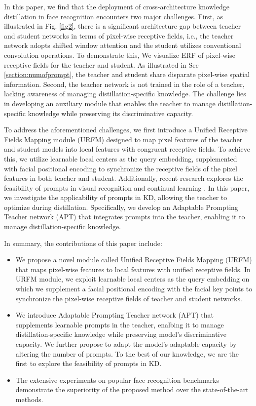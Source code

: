 \documentclass[sigconf]{acmart}
\begin{document}
In this paper, we find that the deployment of cross-architecture knowledge distillation in face recognition encounters two major challenges. First, as illustrated in Fig. \ref{fig2}, there is a significant architecture gap between teacher and student networks in terms of pixel-wise receptive fields, i.e., the teacher network adopts shifted window attention \cite{swin} and the student utilizes conventional convolution operations. To demonstrate this, We visualize ERF \cite{erf} of pixel-wise receptive fields for the teacher and student. As illustrated in Sec \ref{section:numofprompt}, the teacher and student share disparate pixel-wise spatial information. Second, the teacher network is not trained in the role of a teacher, lacking awareness of managing distillation-specific knowledge. The challenge lies in developing an auxiliary module that enables the teacher to manage distillation-specific knowledge while preserving its discriminative capacity.

To address the aforementioned challenges, we first introduce a Unified Receptive Fields Mapping module (URFM) designed to map pixel features of the teacher and student models into local features with congruent receptive fields. To achieve this, we utilize learnable local centers as the query embedding, supplemented with facial positional encoding to synchronize the receptive fields of the pixel features in both teacher and student. Additionally, recent research explores the feasibility of prompts in visual recognition and continual learning \cite{vpt, continual1, continual2}. In this paper, we investigate the applicability of prompts in KD, allowing the teacher to optimize during distillation. Specifically, we develop an Adaptable Prompting Teacher network (APT) that integrates prompts into the teacher, enabling it to manage distillation-specific knowledge.

In summary, the contributions of this paper include:

\begin{itemize}
\item We propose a novel module called Unified Receptive Fields Mapping (URFM) that maps pixel-wise features to local features with unified receptive fields. In URFM module, we exploit learnable local centers as the query embedding on which we supplement a facial positional encoding with the facial key points to synchronize the pixel-wise receptive fields of teacher and student networks.
\item We introduce Adaptable Prompting Teacher network (APT) that supplements learnable prompts in the teacher, enalbing it to manage distillation-specific knowledge while preserving model's discriminative capacity. We further propose to adapt the model's adaptable capacity by altering the number of prompts. To the best of our knowledge, we are the first to explore the feasibility of prompts in KD.
\item The extensive experiments on popular face recognition benchmarks demonstrate the superiority of the proposed method over the state-of-the-art methods.
\end{itemize}
\end{document}
